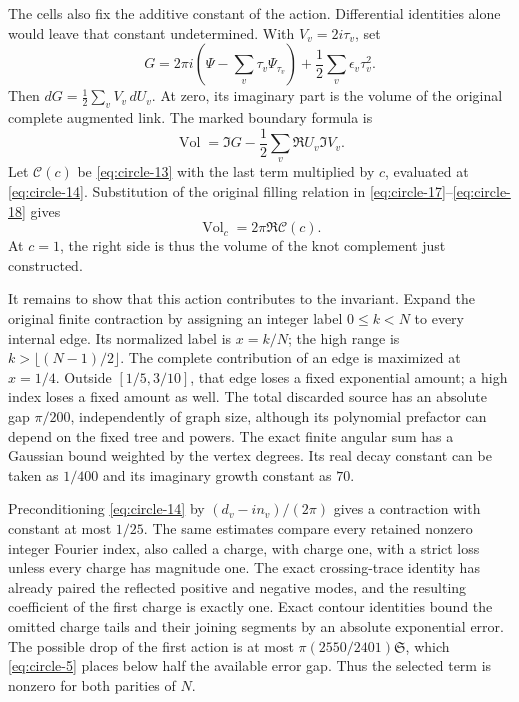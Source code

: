 The cells also fix the additive constant of the action. Differential
identities alone would leave that constant undetermined. With
\(V_v=2i\tau_v\), set \begin{equation}
 G=2\pi i\left(\Psi-\sum_v\tau_v\Psi_{\tau_v}\right)
                                  +\frac12\sum_v\epsilon_v\tau_v^2.
 \label{eq:circle-17}
\end{equation} Then \(dG=\frac12\sum_vV_v\,dU_v\). At zero, its imaginary part is
the volume of the original complete augmented link. The marked boundary
formula is \begin{equation}
 \operatorname{Vol}=\Im G-\frac12\sum_v\Re U_v\Im V_v.
 \label{eq:circle-18}
\end{equation} Let \(\mathcal C(c)\) be \eqref{eq:circle-13} with the last term multiplied by \(c\),
evaluated at \eqref{eq:circle-14}. Substitution of the original filling relation in
\eqref{eq:circle-17}--\eqref{eq:circle-18} gives \begin{equation}
                         \operatorname{Vol}_c=2\pi\Re\mathcal C(c).
 \label{eq:circle-19}
\end{equation} At \(c=1\), the right side is thus the volume of the knot complement
just constructed.

It remains to show that this action contributes to the invariant.
Expand the original finite contraction by assigning an integer label
\(0\le k<N\) to every internal edge. Its
normalized label is \(x=k/N\); the high range is
\(k>\lfloor(N-1)/2\rfloor\). The complete contribution of an edge is
maximized at \(x=1/4\). Outside \([1/5,3/10]\), that edge loses a fixed
exponential amount; a high index loses a fixed amount as well. The total
discarded source has an absolute gap \(\pi/200\), independently of graph
size, although its polynomial prefactor can depend on the fixed tree and
powers. The exact finite angular sum has a Gaussian bound weighted by
the vertex degrees. Its real decay constant can be taken as \(1/400\)
and its imaginary growth constant as \(70\).

Preconditioning \eqref{eq:circle-14} by \((d_v-i n_v)/(2\pi)\) gives a contraction with
constant at most \(1/25\). The same estimates compare every retained
nonzero integer Fourier index, also called a charge, with charge one, with a strict loss unless every
charge has magnitude one. The exact crossing-trace identity has already
paired the reflected positive and negative modes, and the resulting
coefficient of the first charge is exactly one. Exact contour identities
bound the omitted charge tails and their joining segments by an absolute
exponential error. The possible drop of the first action is at most
\(\pi(2550/2401)\mathfrak S\), which \eqref{eq:circle-5} places below half the available
error gap. Thus the selected term is nonzero for both parities of \(N\).

